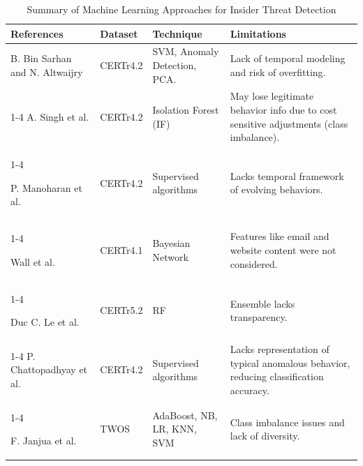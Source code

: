 \begin{table}[!ht]
\caption{Summary of Machine Learning Approaches for Insider Threat Detection}\label{tbl1}
\begin{tabular}{   p{3cm}p{2cm}  p{3cm}  p{4cm} }
\toprule
\textbf{References} & \textbf{Dataset} & \textbf{Technique}  & \textbf{Limitations} \\
\midrule
 

B. Bin Sarhan and N. Altwaijry \cite{bin2022insider} & CERTr4.2 & SVM, Anomaly Detection, PCA. &  Lack of temporal modeling and risk of overfitting. \\
\cmidrule(lr){1-4}
A. Singh et al. \cite{singh2024improving} & CERTr4.2 & Isolation Forest (IF) & May lose legitimate behavior info due to cost sensitive adjustments (class imbalance).\\
\cmidrule(lr){1-4}

P. Manoharan et al. \cite{manoharan2023insider} & CERTr4.2 & Supervised algorithms &  Lacks temporal framework of evolving behaviors. \\
\cmidrule(lr){1-4}


 Wall et al. \cite{wall2021bayesian}& CERTr4.1 & Bayesian Network & Features like email and website content were not considered. \\
\cmidrule(lr){1-4}

Duc C. Le et al. \cite{le2020analyzing}& CERTr5.2 & RF & Ensemble lacks transparency. \\
\cmidrule(lr){1-4}
P. Chattopadhyay et al. \cite{chattopadhyay2018scenario}& CERTr4.2 & Supervised algorithms & Lacks representation of typical anomalous behavior, reducing classification accuracy. \\
\cmidrule(lr){1-4}

F. Janjua et al. \cite{janjua2020handling}& TWOS & AdaBoost, NB, LR, KNN, SVM & Class imbalance issues and lack of diversity. \\
\bottomrule
\end{tabular}

\end{table}


